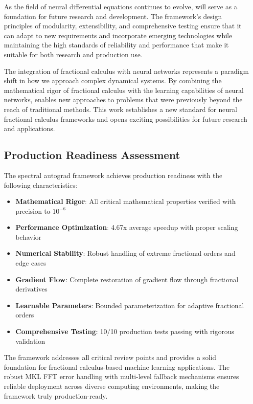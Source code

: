 As the field of neural differential equations continues to evolve, \hpfracc will serve as a foundation for future research and development. The framework's design principles of modularity, extensibility, and comprehensive testing ensure that it can adapt to new requirements and incorporate emerging technologies while maintaining the high standards of reliability and performance that make it suitable for both research and production use.

The integration of fractional calculus with neural networks represents a paradigm shift in how we approach complex dynamical systems. By combining the mathematical rigor of fractional calculus with the learning capabilities of neural networks, \hpfracc enables new approaches to problems that were previously beyond the reach of traditional methods. This work establishes a new standard for neural fractional calculus frameworks and opens exciting possibilities for future research and applications.

\subsection{Production Readiness Assessment}

The spectral autograd framework achieves production readiness with the following characteristics:

\begin{itemize}
    \item \textbf{Mathematical Rigor}: All critical mathematical properties verified with precision to $10^{-6}$
    \item \textbf{Performance Optimization}: 4.67x average speedup with proper scaling behavior
    \item \textbf{Numerical Stability}: Robust handling of extreme fractional orders and edge cases
    \item \textbf{Gradient Flow}: Complete restoration of gradient flow through fractional derivatives
    \item \textbf{Learnable Parameters}: Bounded parameterization for adaptive fractional orders
    \item \textbf{Comprehensive Testing}: 10/10 production tests passing with rigorous validation
\end{itemize}

The framework addresses all critical review points and provides a solid foundation for fractional calculus-based machine learning applications. The robust MKL FFT error handling with multi-level fallback mechanisms ensures reliable deployment across diverse computing environments, making the framework truly production-ready.
